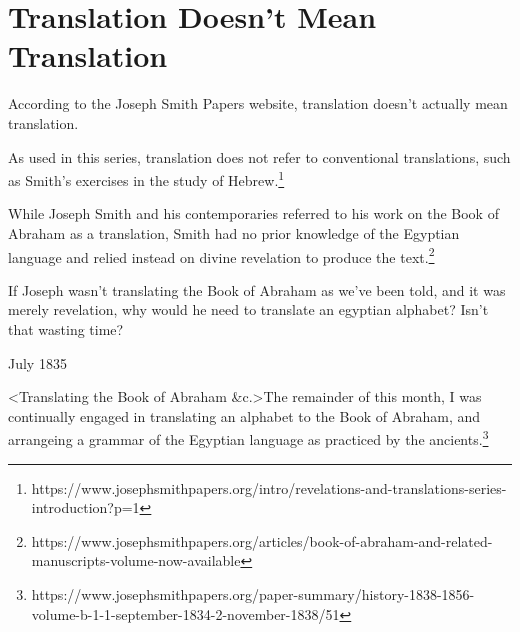 \section{Translation Doesn't Mean Translation}

According to the Joseph Smith Papers website, translation doesn't actually mean
translation.

\begin{displayquote}
As used in this series, translation does not refer to conventional translations, 
such as Smith’s exercises in the study of Hebrew.\footnote{
https://www.josephsmithpapers.org/intro/revelations-and-translations-series-introduction?p=1
}
\end{displayquote}

\begin{displayquote}
While Joseph Smith and his contemporaries referred to his work on the Book of Abraham 
as a translation, Smith had no prior knowledge of the Egyptian language and relied 
instead on divine revelation to produce the text.\footnote{
https://www.josephsmithpapers.org/articles/book-of-abraham-and-related-manuscripts-volume-now-available
}
\end{displayquote}

If Joseph wasn't translating the Book of Abraham as we've been told, and it was
merely revelation, why would he need to translate an egyptian alphabet? Isn't that
wasting time?

\begin{displayquote}
July 1835

\textless Translating the Book of Abraham \&c.\textgreater The remainder of this month, I was 
continually engaged in translating an alphabet to the Book of Abraham, and 
arrangeing a grammar of the Egyptian language as practiced by the
ancients.\footnote{
https://www.josephsmithpapers.org/paper-summary/history-1838-1856-volume-b-1-1-september-1834-2-november-1838/51
}
\end{displayquote}